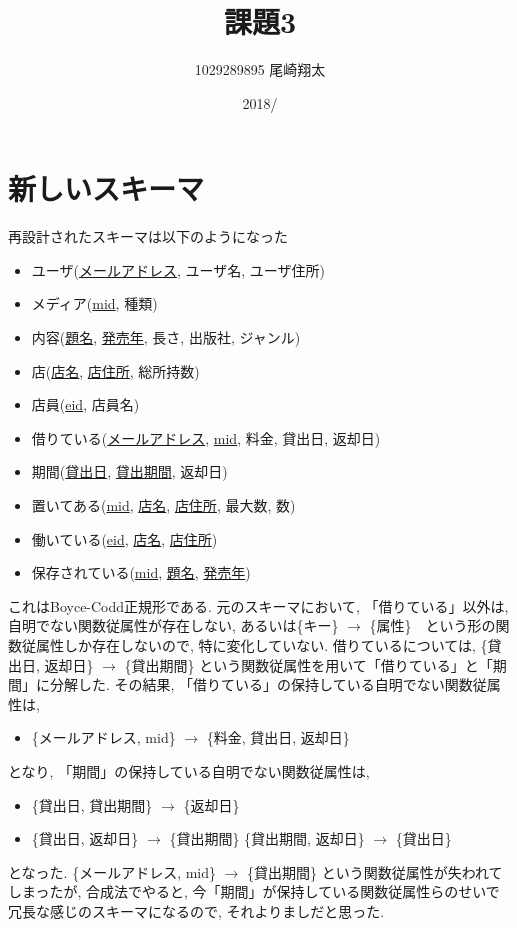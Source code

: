 \documentclass{jarticle}
\begin{document}
\title{課題3}
\author{1029289895 尾崎翔太}
\date{2018/}

\maketitle
\newpage


\section{新しいスキーマ}
再設計されたスキーマは以下のようになった
\begin{itemize}
\item ユーザ(\underline{メールアドレス}, ユーザ名, ユーザ住所)
\item メディア(\underline{mid}, 種類)
\item 内容(\underline{題名}, \underline{発売年}, 長さ, 出版社, ジャンル)
\item 店(\underline{店名}, \underline{店住所}, 総所持数)
\item 店員(\underline{eid}, 店員名)
\item 借りている(\underline{メールアドレス}, \underline{mid}, 料金, 貸出日, 返却日)
\item 期間(\underline{貸出日}, \underline{貸出期間}, 返却日)
\item 置いてある(\underline{mid}, \underline{店名}, \underline{店住所}, 最大数, 数)
\item 働いている(\underline{eid}, \underline{店名}, \underline{店住所})
\item 保存されている(\underline{mid}, \underline{題名}, \underline{発売年})
\end{itemize}
これはBoyce-Codd正規形である. 元のスキーマにおいて, 「借りている」以外は, 自明でない関数従属性が存在しない, あるいは\{キー\} $\rightarrow$ \{属性\}　という形の関数従属性しか存在しないので, 特に変化していない. 借りているについては, \{貸出日, 返却日\} $\rightarrow$ \{貸出期間\} という関数従属性を用いて「借りている」と「期間」に分解した. その結果, 「借りている」の保持している自明でない関数従属性は,
\begin{itemize}
\item \{メールアドレス, mid\} $\rightarrow$ \{料金, 貸出日, 返却日\}
\end{itemize}
となり, 「期間」の保持している自明でない関数従属性は,
\begin{itemize}
\item \{貸出日, 貸出期間\} $\rightarrow$ \{返却日\}
\item \{貸出日, 返却日\} $\rightarrow$ \{貸出期間\}
\itme \{貸出期間, 返却日\} $\rightarrow$ \{貸出日\}
\end{itemize}
となった. \{メールアドレス, mid\} $\rightarrow$ \{貸出期間\} という関数従属性が失われてしまったが, 合成法でやると, 今「期間」が保持している関数従属性らのせいで冗長な感じのスキーマになるので, それよりましだと思った.
\end{document}
